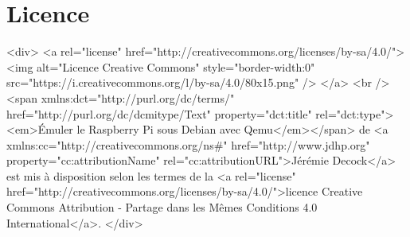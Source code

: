 \documentclass{article}
\begin{document}
    \section*{Licence}\label{sec:license}

    \begin{rawhtml}

        <div>
            <a rel="license" href="http://creativecommons.org/licenses/by-sa/4.0/">
                <img alt="Licence Creative Commons" style="border-width:0" src="https://i.creativecommons.org/l/by-sa/4.0/80x15.png" />
            </a>
            <br />
            <span xmlns:dct="http://purl.org/dc/terms/" href="http://purl.org/dc/dcmitype/Text" property="dct:title" rel="dct:type"><em>Émuler le Raspberry Pi sous Debian avec Qemu</em></span> de <a xmlns:cc="http://creativecommons.org/ns#" href="http://www.jdhp.org" property="cc:attributionName" rel="cc:attributionURL">Jérémie Decock</a> est mis à disposition selon les termes de la <a rel="license" href="http://creativecommons.org/licenses/by-sa/4.0/">licence Creative Commons Attribution -  Partage dans les Mêmes Conditions 4.0 International</a>.
        </div>

    \end{rawhtml}
\fi
\end{document}
